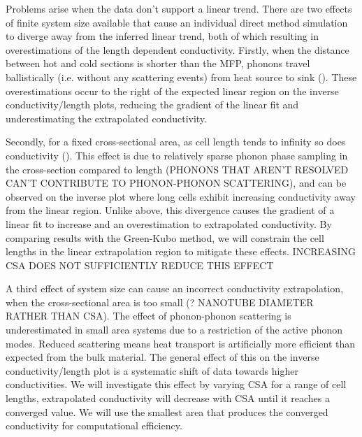\documentclass[%
preprint,                                  %
nofootinbib,
 amsmath,amssymb,
 aps,
]{revtex4-1}
\begin{document}
Problems arise when the data don't support a linear trend. There are two effects of finite system size available that cause an individual direct method simulation to diverge away from the inferred linear trend, both of which resulting in overestimations of the length dependent conductivity. Firstly, when the distance between hot and cold sections is shorter than the MFP, phonons travel ballistically (i.e. without any scattering events) from heat source to sink (\citet{Sellan2010}). These overestimations occur to the right of the expected linear region on the inverse conductivity/length plots, reducing the gradient of the linear fit and underestimating the extrapolated conductivity.

Secondly, for a fixed cross-sectional area, as cell length tends to infinity so does conductivity (\cite{Hu2011}). This effect is due to relatively sparse phonon phase sampling in the cross-section compared to length (PHONONS THAT AREN'T RESOLVED CAN'T CONTRIBUTE TO PHONON-PHONON SCATTERING), and can be observed on the inverse plot where long cells exhibit increasing conductivity away from the linear region. Unlike above, this divergence causes the gradient of a linear fit to increase and an overestimation to extrapolated conductivity. By comparing results with the Green-Kubo method, we will constrain the cell lengths in the linear extrapolation region to mitigate these effects. INCREASING CSA DOES NOT SUFFICIENTLY REDUCE THIS EFFECT

A third effect of system size can cause an incorrect conductivity extrapolation, when the cross-sectional area is too small (\citet{Thomas2010}? NANOTUBE DIAMETER RATHER THAN CSA). The effect of phonon-phonon scattering is underestimated in small area systems due to a restriction of the active phonon modes. Reduced scattering means heat transport is artificially more efficient than expected from the bulk material. The general effect of this on the inverse conductivity/length plot is a systematic shift of data towards higher conductivities. We will investigate this effect by varying CSA for a range of cell lengths, extrapolated conductivity will decrease with CSA until it reaches a converged value. We will use the smallest area that produces the converged conductivity for computational efficiency.
\end{document}
